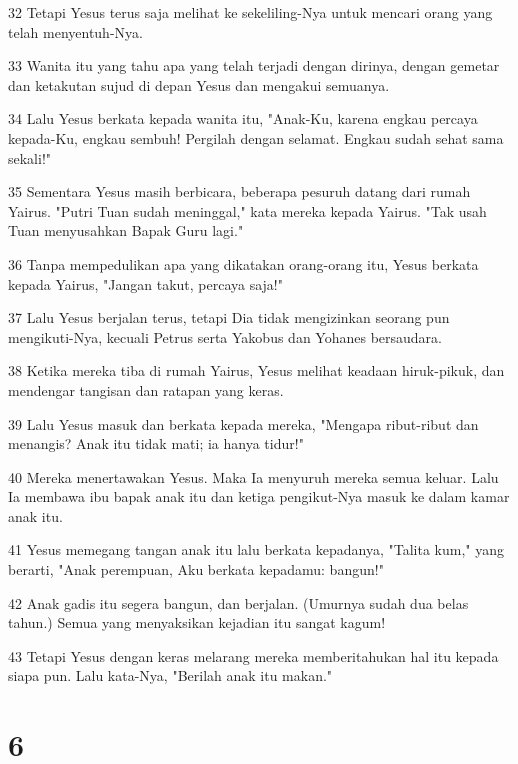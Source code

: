 \par 32 Tetapi Yesus terus saja melihat ke sekeliling-Nya untuk mencari orang yang telah menyentuh-Nya.
\par 33 Wanita itu yang tahu apa yang telah terjadi dengan dirinya, dengan gemetar dan ketakutan sujud di depan Yesus dan mengakui semuanya.
\par 34 Lalu Yesus berkata kepada wanita itu, "Anak-Ku, karena engkau percaya kepada-Ku, engkau sembuh! Pergilah dengan selamat. Engkau sudah sehat sama sekali!"
\par 35 Sementara Yesus masih berbicara, beberapa pesuruh datang dari rumah Yairus. "Putri Tuan sudah meninggal," kata mereka kepada Yairus. "Tak usah Tuan menyusahkan Bapak Guru lagi."
\par 36 Tanpa mempedulikan apa yang dikatakan orang-orang itu, Yesus berkata kepada Yairus, "Jangan takut, percaya saja!"
\par 37 Lalu Yesus berjalan terus, tetapi Dia tidak mengizinkan seorang pun mengikuti-Nya, kecuali Petrus serta Yakobus dan Yohanes bersaudara.
\par 38 Ketika mereka tiba di rumah Yairus, Yesus melihat keadaan hiruk-pikuk, dan mendengar tangisan dan ratapan yang keras.
\par 39 Lalu Yesus masuk dan berkata kepada mereka, "Mengapa ribut-ribut dan menangis? Anak itu tidak mati; ia hanya tidur!"
\par 40 Mereka menertawakan Yesus. Maka Ia menyuruh mereka semua keluar. Lalu Ia membawa ibu bapak anak itu dan ketiga pengikut-Nya masuk ke dalam kamar anak itu.
\par 41 Yesus memegang tangan anak itu lalu berkata kepadanya, "Talita kum," yang berarti, "Anak perempuan, Aku berkata kepadamu: bangun!"
\par 42 Anak gadis itu segera bangun, dan berjalan. (Umurnya sudah dua belas tahun.) Semua yang menyaksikan kejadian itu sangat kagum!
\par 43 Tetapi Yesus dengan keras melarang mereka memberitahukan hal itu kepada siapa pun. Lalu kata-Nya, "Berilah anak itu makan."

\chapter{6}

